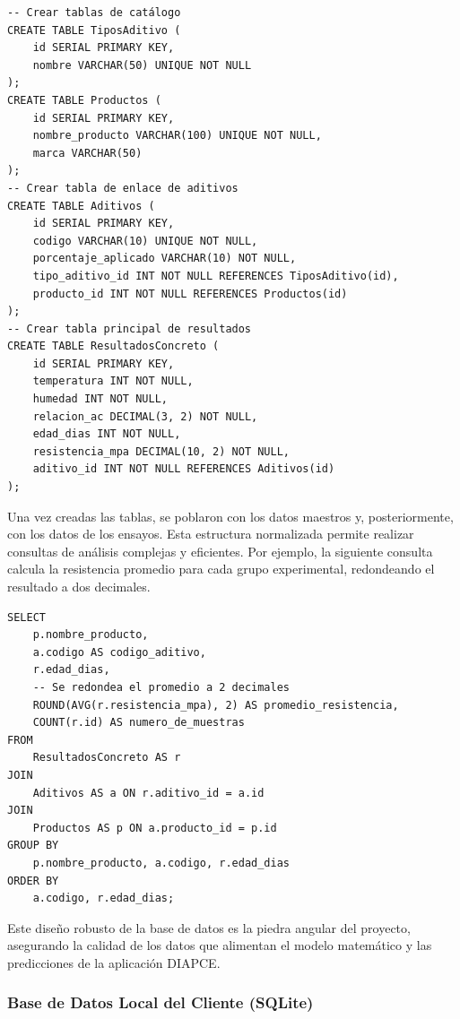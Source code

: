 \documentclass[12pt, letterpaper]{article}
\begin{document}
\begin{lstlisting}[style=sqlstyle, caption=Script de creación de las 4 tablas en PostgreSQL.]
-- Crear tablas de catálogo
CREATE TABLE TiposAditivo (
    id SERIAL PRIMARY KEY,
    nombre VARCHAR(50) UNIQUE NOT NULL
);
CREATE TABLE Productos (
    id SERIAL PRIMARY KEY,
    nombre_producto VARCHAR(100) UNIQUE NOT NULL,
    marca VARCHAR(50)
);
-- Crear tabla de enlace de aditivos
CREATE TABLE Aditivos (
    id SERIAL PRIMARY KEY,
    codigo VARCHAR(10) UNIQUE NOT NULL,
    porcentaje_aplicado VARCHAR(10) NOT NULL,
    tipo_aditivo_id INT NOT NULL REFERENCES TiposAditivo(id),
    producto_id INT NOT NULL REFERENCES Productos(id)
);
-- Crear tabla principal de resultados
CREATE TABLE ResultadosConcreto (
    id SERIAL PRIMARY KEY,
    temperatura INT NOT NULL,
    humedad INT NOT NULL,
    relacion_ac DECIMAL(3, 2) NOT NULL,
    edad_dias INT NOT NULL,
    resistencia_mpa DECIMAL(10, 2) NOT NULL,
    aditivo_id INT NOT NULL REFERENCES Aditivos(id)
);
\end{lstlisting}

Una vez creadas las tablas, se poblaron con los datos maestros y, posteriormente, con los datos de los ensayos. Esta estructura normalizada permite realizar consultas de análisis complejas y eficientes. Por ejemplo, la siguiente consulta calcula la resistencia promedio para cada grupo experimental, redondeando el resultado a dos decimales.

\begin{lstlisting}[style=sqlstyle, caption=Cálculo de la resistencia promedio por grupo experimental.]
SELECT
    p.nombre_producto,
    a.codigo AS codigo_aditivo,
    r.edad_dias,
    -- Se redondea el promedio a 2 decimales
    ROUND(AVG(r.resistencia_mpa), 2) AS promedio_resistencia,
    COUNT(r.id) AS numero_de_muestras
FROM
    ResultadosConcreto AS r
JOIN
    Aditivos AS a ON r.aditivo_id = a.id
JOIN
    Productos AS p ON a.producto_id = p.id
GROUP BY
    p.nombre_producto, a.codigo, r.edad_dias
ORDER BY
    a.codigo, r.edad_dias;
\end{lstlisting}

Este diseño robusto de la base de datos es la piedra angular del proyecto, asegurando la calidad de los datos que alimentan el modelo matemático y las predicciones de la aplicación DIAPCE.

\subsubsection{Base de Datos Local del Cliente (SQLite)}
\end{document}

